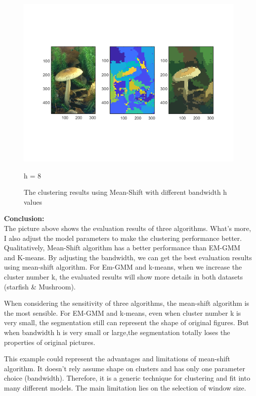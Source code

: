 \documentclass[12pt]{article}
\begin{document}
\begin{figure}[H]
\begin{minipage}{.5\textwidth}
		\includegraphics[width=\textwidth,height=\textheight,keepaspectratio]{figs/2-b-ms-1-h8}
		\caption{\small h = 8}
	\end{minipage}
	\caption{The clustering results using Mean-Shift with different bandwidth h values}
  \end{figure}

\textbf{Conclusion:}\\

The picture above shows the evaluation results of three algorithms. What's more, I also adjust the model parameters to make the clustering performance better. Qualitatively, Mean-Shift algorithm has a better performance than EM-GMM and K-means. By adjusting the bandwidth, we can get the best evaluation results using mean-shift algorithm. For Em-GMM and k-means, when we increase the cluster number k, the evaluated results will show more details in both datasets (starfish \& Mushroom). 

When considering the sensitivity of three algorithms, the mean-shift algorithm is the most sensible. For EM-GMM and k-means, even when cluster number k is very small, the segmentation still can represent the shape of original figures. But when bandwidth h is very small or large,the segmentation totally loses the properties of original pictures. 

This example could represent the advantages and limitations of mean-shift algorithm. It doesn't rely assume shape on clusters and has only one parameter choice (bandwidth). Therefore, it is a generic technique for clustering and fit into many different models. The main limitation lies on the selection of window size.
\end{document}
